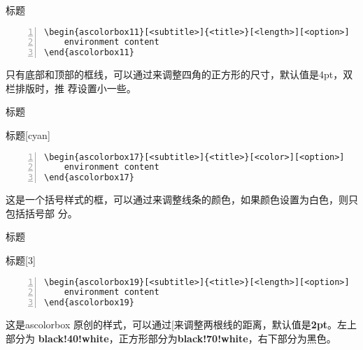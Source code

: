 \begin{ascolorbox11}[子标题]{标题}
    \zhlipsum[1]
\end{ascolorbox11}
\begin{lstlisting}[backgroundcolor=\color{gray!5},framerule=1pt,frame=tb,numbers=left,
    numberstyle=\tiny\color{black},]
\begin{ascolorbox11}[<subtitle>]{<title>}[<length>][<option>]
    environment content
\end{ascolorbox11}
\end{lstlisting}
只有底部和顶部的框线，可以通过\md{[⟨length⟩]}来调整四角的正方形的尺寸，默认值是4pt，双栏排版时，推
荐设置小一些。

\begin{ascolorbox17}[子标题]{标题}
    \zhlipsum[1]
\end{ascolorbox17}

\begin{ascolorbox17}[子标题]{标题}[cyan]
    \zhlipsum[1]
\end{ascolorbox17}
\begin{lstlisting}[backgroundcolor=\color{gray!5},framerule=1pt,frame=tb,numbers=left,
    numberstyle=\tiny\color{black},]
\begin{ascolorbox17}[<subtitle>]{<title>}[<color>][<option>]
    environment content
\end{ascolorbox17}
\end{lstlisting}
这是一个括号样式的框，可以通过\md{[⟨color⟩]}来调整线条的颜色，如果颜色设置为白色，则只包括括号部
分。

\begin{ascolorbox19}[子标题]{标题}
    \zhlipsum[1]
\end{ascolorbox19}

\begin{ascolorbox19}[子标题]{标题}[3]
    \zhlipsum[1]
\end{ascolorbox19}

\begin{lstlisting}[backgroundcolor=\color{gray!5},framerule=1pt,frame=tb,numbers=left,
    numberstyle=\tiny\color{black},]
\begin{ascolorbox19}[<subtitle>]{<title>}[<length>][<option>]
    environment content
\end{ascolorbox19}
\end{lstlisting}
这是ascolorbox 原创的样式，可以通过[\md{[⟨length⟩]}来调整两根线的距离，默认值是\textbf{2pt}。左上部分为
\textbf{black!40!white}，正方形部分为\textbf{black!70!white}，右下部分为黑色。

